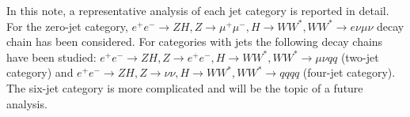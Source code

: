 \documentclass[11pt,a4paper]{cepcnote}
\begin{document}
In this note, a representative analysis of each jet category is reported in detail. For the zero-jet category, 
$e^+e^-\rightarrow ZH, Z\rightarrow \mu^+\mu^-, H\rightarrow WW^*, WW^*\rightarrow e\nu\mu\nu$ decay chain has been considered. 
For categories with jets the following decay chains have been studied:
$e^+e^-\rightarrow ZH, Z\rightarrow e^+e^-,  H\rightarrow WW^*, WW^*\rightarrow \mu\nu qq$ (two-jet category)  
and $e^+e^-\rightarrow ZH, Z\rightarrow \nu\nu,  H\rightarrow WW^*, WW^*\rightarrow qqqq$ (four-jet category).
The six-jet category is more complicated and will be the topic of a future analysis.


\end{document}
